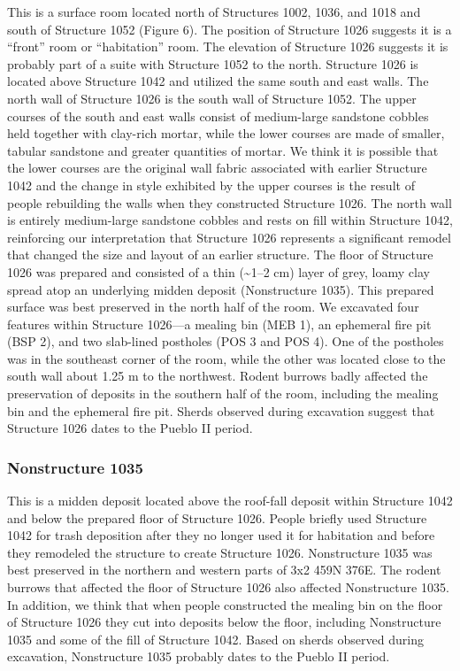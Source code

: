 \documentclass[
  12pt,
]{krantz}
\begin{document}
This is a surface room located north of Structures 1002, 1036, and 1018
and south of Structure 1052 (Figure 6). The position of Structure 1026
suggests it is a ``front'' room or ``habitation'' room. The elevation of
Structure 1026 suggests it is probably part of a suite with Structure
1052 to the north. Structure 1026 is located above Structure 1042 and
utilized the same south and east walls. The north wall of Structure 1026
is the south wall of Structure 1052. The upper courses of the south and
east walls consist of medium-large sandstone cobbles held together with
clay-rich mortar, while the lower courses are made of smaller, tabular
sandstone and greater quantities of mortar. We think it is possible that
the lower courses are the original wall fabric associated with earlier
Structure 1042 and the change in style exhibited by the upper courses is
the result of people rebuilding the walls when they constructed
Structure 1026. The north wall is entirely medium-large sandstone
cobbles and rests on fill within Structure 1042, reinforcing our
interpretation that Structure 1026 represents a significant remodel that
changed the size and layout of an earlier structure. The floor of
Structure 1026 was prepared and consisted of a thin (\textasciitilde1--2 cm) layer of
grey, loamy clay spread atop an underlying midden deposit (Nonstructure
1035). This prepared surface was best preserved in the north half of the
room. We excavated four features within Structure 1026---a mealing bin
(MEB 1), an ephemeral fire pit (BSP 2), and two slab-lined postholes
(POS 3 and POS 4). One of the postholes was in the southeast corner of
the room, while the other was located close to the south wall about 1.25
m to the northwest. Rodent burrows badly affected the preservation of
deposits in the southern half of the room, including the mealing bin and
the ephemeral fire pit. Sherds observed during excavation suggest that
Structure 1026 dates to the Pueblo II period.

\hypertarget{nonstructure-1035}{%
\subsubsection{Nonstructure 1035}\label{nonstructure-1035}}

This is a midden deposit located above the roof-fall deposit within
Structure 1042 and below the prepared floor of Structure 1026. People
briefly used Structure 1042 for trash deposition after they no longer
used it for habitation and before they remodeled the structure to create
Structure 1026. Nonstructure 1035 was best preserved in the northern and
western parts of 3x2 459N 376E. The rodent burrows that affected the
floor of Structure 1026 also affected Nonstructure 1035. In addition, we
think that when people constructed the mealing bin on the floor of
Structure 1026 they cut into deposits below the floor, including
Nonstructure 1035 and some of the fill of Structure 1042. Based on
sherds observed during excavation, Nonstructure 1035 probably dates to
the Pueblo II period.
\end{document}

